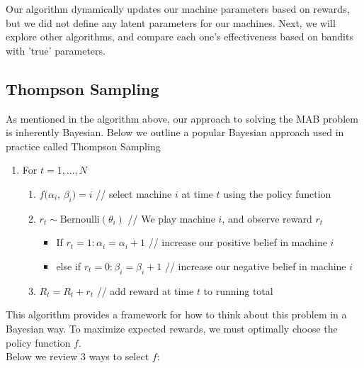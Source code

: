 \documentclass{article}
\begin{document}
Our algorithm dynamically updates our machine parameters based on rewards, but we did not define any latent parameters for our machines. Next, we will explore other algorithms, and compare each one's effectiveness based on bandits with 'true' parameters.

\subsection{Thompson Sampling}

As mentioned in the algorithm above, our approach to solving the MAB problem is inherently Bayesian. Below we outline a popular Bayesian approach used in practice called Thompson Sampling

\begin{enumerate}
\item For $t = 1, ..., N$
	\begin{enumerate}
	\item $f(\alpha_i$, $\beta_i) = i$  // select machine $i$ at time $t$ using the policy function
	\item $r_t \sim \text{Bernoulli}(\theta_{i})$   // We play machine $i$, and observe reward $r_t$
	\begin{itemize}
		\item If $r_t = 1: \alpha_i = \alpha_i + 1$   // increase our positive belief in machine $i$
		\item else if $r_t = 0: \beta_i = \beta_i + 1$  // increase our negative belief in machine $i$
	\end{itemize}
	\item $R_t = R_t + r_t$		// add reward at time $t$ to running total
	\end{enumerate}
\end{enumerate}

This algorithm provides a framework for how to think about this problem in a Bayesian way. To maximize expected rewards, we must optimally choose the policy function $f$.\\

Below we review 3 ways to select $f$:
\end{document}
